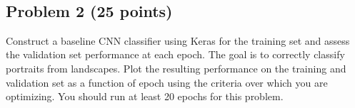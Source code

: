 \documentclass[11pt]{article}
\begin{document}
    \begin{center}
    \end{center}
    { \hspace*{\fill} \\}
    
    \subsection{Problem 2 (25 points)}\label{problem-2-25-points}

Construct a baseline CNN classifier using Keras for the training set and
assess the validation set performance at each epoch. The goal is to
correctly classify portraits from landscapes. Plot the resulting
performance on the training and validation set as a function of epoch
using the criteria over which you are optimizing. You should run at
least 20 epochs for this problem.
\end{document}
